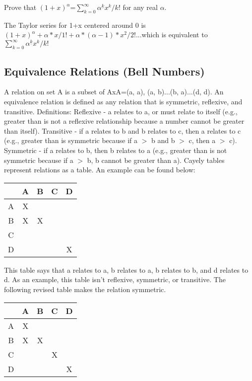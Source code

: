     \begin{problem}{11}{Prove that $(1+x)^\alpha$=$\sum_{k=0}^{\infty} {\alpha^{\underline{k}}x^k/k!}$ for any real $ \alpha$.}
\end{problem}
    The Taylor series for 1+x centered around 0 is $(1+x)^\alpha+\alpha*x/1!+\alpha*(\alpha-1)*x^2/2!$...which is equivalent to $\sum_{k=0}^{\infty}{\alpha^{\underline{k}}x^k/k!}$

    \subsection{Equivalence Relations (Bell Numbers)}
A relation on set A is a subset of AxA={(a, a), (a, b)...(b, a)...(d, d)}. An equivalence relation is defined as any relation that is symmetric, reflexive, and transitive. 
\newline
Definitions:
\newline
Reflexive - a relates to a, or must relate to itself (e.g., greater than is not a reflexive relationship because a number cannot be greater than itself).
\newline
Transitive - if a relates to b and b relates to c, then a relates to c (e.g., greater than is symmetric because if a \(>\) b and b \(>\) c, then a \(>\) c).
\newline
Symmetric - if a relates to b, then b relates to a (e.g., greater than is not symmetric because if a \(>\) b, b cannot be greater than a).
\newline
Cayely tables represent relations as a table. An example can be found below:
\begin{center}
\begin{tabular} {c|c c c c}
& A & B & C & D \\
\hline
A & X &  &  &  \\
B & X & X &  &  \\
C &  &  &  &  \\
D &  &  &  & X \\
\end{tabular}
\end{center}
This table says that a relates to a, b relates to a, b relates to b, and d relates to d. As an example, this table isn't reflexive, symmetric, or transitive.
The following revised table makes the relation symmetric.
\begin{center}
\begin{tabular} {c|c c c c}
& A & B & C & D \\
\hline
A & X &  &  &  \\
B & X & X &  &  \\
C &  &  & X &  \\
D &  &  &  & X \\
\end{tabular}
\end{center}
